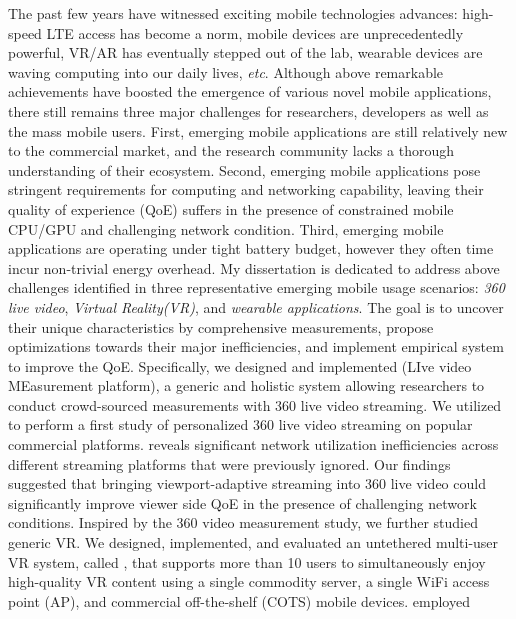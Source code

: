 The past few years have witnessed exciting mobile technologies advances: high-speed LTE access has become a norm, mobile devices are unprecedentedly powerful, VR/AR has eventually stepped out of the lab, wearable devices are waving computing into our daily lives, \emph{etc}.
 Although above remarkable achievements have boosted the emergence of various novel mobile applications, there still remains three major challenges for researchers, developers as well as the mass mobile users. First, emerging mobile applications are still relatively new to the commercial market, and the research community lacks a thorough understanding of their ecosystem. 
 Second, emerging mobile applications pose stringent requirements for computing and networking capability, leaving their quality of experience (QoE) suffers in the presence of constrained mobile CPU/GPU and challenging network condition. 
 Third, emerging mobile applications are operating under tight battery budget, however they often time incur non-trivial energy overhead. 
 My dissertation is dedicated to address above challenges identified in three representative emerging mobile usage scenarios: \emph{360\degree{} live video}, \emph{Virtual Reality(VR)}, and \emph{wearable applications}. 
 The goal is to uncover their unique characteristics by comprehensive measurements, propose optimizations towards their major inefficiencies, and implement empirical system to improve the QoE.
  Specifically, we designed and implemented \lime (LIve video MEasurement platform), a generic and holistic system allowing researchers to conduct crowd-sourced measurements with 360\degree{} live video streaming. We utilized \lime to perform a first study of personalized 360\degree{} live video streaming on popular commercial platforms. \lime reveals significant network utilization inefficiencies across different streaming platforms that were previously ignored. Our findings suggested that bringing viewport-adaptive streaming into 360\degree{} live video could significantly improve viewer side QoE in the presence of challenging network conditions. 
 Inspired by the 360\degree{} video measurement study, we further studied generic VR. We designed, implemented, and evaluated an untethered multi-user VR system, called \firefly, that supports more than 10
 users to simultaneously enjoy high-quality VR content using a
 single commodity server, a single WiFi access point (AP), and commercial
 off-the-shelf (COTS) mobile devices. \firefly employed
